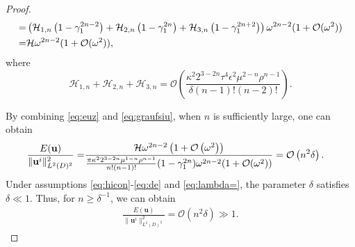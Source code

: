 \documentclass[11pt,reqno,twoside]{amsart}
\theoremstyle{definition}
\theoremstyle{remark}
\numberwithin{equation}{section}
\newcommand{\bu}{\mathbf{u}}
\begin{document}
\begin{proof}
\begin{align}
					=&\left(\mathcal{H}_{1,n}\left(1-\gamma_1^{2n-2}\right)+\mathcal{H}_{2,n}\left(1-\gamma_1^{2n}\right)+\mathcal{H}_{3,n}\left(1-\gamma_1^{2n+2}\right)\right)\omega ^{2n-2}(1+\mathcal{O}(\omega ^2 ))\notag\\
					=&\mathcal{H}\omega ^{2n-2}(1+\mathcal{O}(\omega ^2 )),
				\end{align}
				where\[\mathcal{H}_{1,n}+\mathcal{H}_{2,n}+\mathcal{H}_{3,n}=\mathcal{O}\left(\frac{\kappa^2 2^{3-2 n} \tau ^4 \epsilon ^2 \mu ^{2-n} \rho ^{n-1}}{\delta  (n-1)!  (n-2)!}\right).\]
				
				By combining \eqref{eq:euz} and \eqref{eq:graufsiu}, when $n$ is sufficiently large, one can obtain 
				\begin{align}
					\frac{E(\bu)}{\|{\bu}^i\|_{L^2(D)^2}^2}=&\frac{\mathcal{H}\omega^{2n-2}\left(1+\mathcal{O}\left(\omega^2\right)\right)}{ \frac{\pi\kappa ^2 2^{3-2 n} \mu ^{1-n} \rho ^{n-1} }{n!(n-1)!}(1-\gamma _{1}^{2n})\omega^{2n-2}(1+\mathcal{O}(\omega ^2 ))}=\mathcal{O}\left(n^2\delta\right).\notag
				\end{align}
				Under assumptions \eqref{eq:hicon}-\eqref{eq:de} and \eqref{eq:lambda=}, the  parameter $\delta$ satisfies $\delta\ll1$. Thus, for $n \geq \delta^{-1}$, we can obtain
				\begin{align}\label{eq:eu1}  
					\frac{E(\bu)}{\|{\bu}^i\|_{L^2(D)^2}^2} = \mathcal{O}\left(n^2\delta\right) \gg 1.  
				\end{align}  
				

\end{proof}
\end{document}
